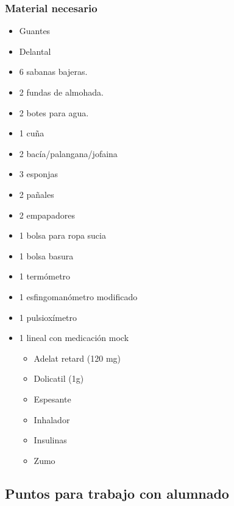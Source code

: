 \subsubsection{Material necesario}
\begin{multicols}{2}
    \begin{itemize}[topsep=0pt, partopsep=0pt,itemsep=0pt,parsep=0pt]
        \item Guantes
        \item Delantal
        \item 6 sabanas bajeras.
        \item 2 fundas de almohada.
        \item 2 botes para agua.
        \item 1 cuña
        \item 2 bacía/palangana/jofaina
        \item 3 esponjas
        \item 2 pañales
        \item 2 empapadores
        \item 1 bolsa para ropa sucia
        \item 1 bolsa basura
        \item 1 termómetro
        \item 1 esfingomanómetro modificado
        \item 1 pulsioxímetro
        \item 1 lineal con medicación mock
        \begin{itemize}[topsep=0pt, partopsep=0pt,itemsep=0pt,parsep=0pt]
            \item Adelat retard (120 mg)
            \item Dolicatil (1g)
            \item Espesante
            \item Inhalador
            \item Insulinas
            \item Zumo
        \end{itemize}
    \end{itemize}
\end{multicols}

\subsection{Puntos para trabajo con alumnado}
